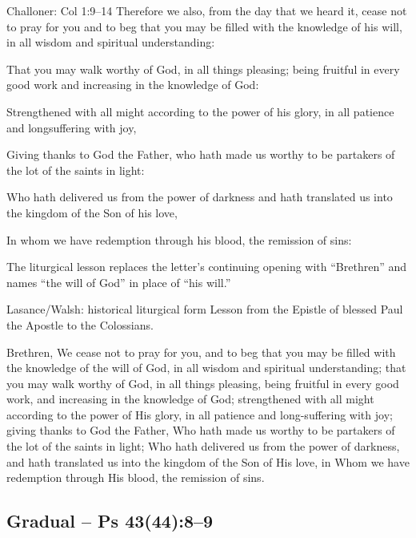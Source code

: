 \begin{englishwitness}{Challoner: Col 1:9--14}
Therefore we also, from the day that we heard it, cease not to pray for
you and to beg that you may be filled with the knowledge of his will,
in all wisdom and spiritual understanding:

That you may walk worthy of God, in all things pleasing; being fruitful
in every good work and increasing in the knowledge of God:

Strengthened with all might according to the power of his glory, in all
patience and longsuffering with joy,

Giving thanks to God the Father, who hath made us worthy to be partakers
of the lot of the saints in light:

Who hath delivered us from the power of darkness and hath translated us
into the kingdom of the Son of his love,

In whom we have redemption through his blood, the remission of sins:
\end{englishwitness}

The liturgical lesson replaces the letter's continuing opening with
``Brethren'' and names ``the will of God'' in place of ``his will.''

\begin{englishwitness}{Lasance/Walsh: historical liturgical form}
Lesson from the Epistle of blessed Paul the Apostle to the Colossians.

Brethren, We cease not to pray for you, and to beg that you may be filled
with the knowledge of the will of God, in all wisdom and spiritual
understanding; that you may walk worthy of God, in all things pleasing,
being fruitful in every good work, and increasing in the knowledge of God;
strengthened with all might according to the power of His glory, in all
patience and long-suffering with joy; giving thanks to God the Father, Who
hath made us worthy to be partakers of the lot of the saints in light;
Who hath delivered us from the power of darkness, and hath translated us
into the kingdom of the Son of His love, in Whom we have redemption through
His blood, the remission of sins.
\end{englishwitness}

\subsection{Gradual -- Ps 43(44):8--9}
\label{proper-gradual}

